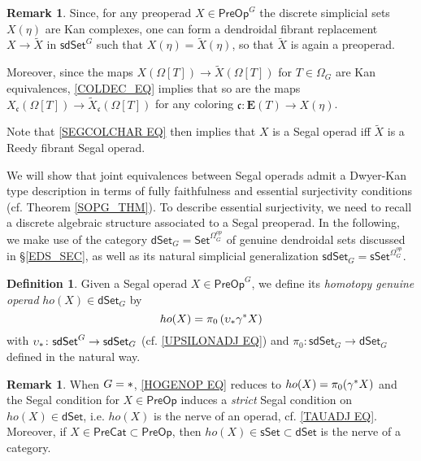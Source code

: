 \documentclass[a4paper,10pt
,draft
]{article}%
\numberwithin{equation}{section}
\numberwithin{figure}{section}
\theoremstyle{definition} %
\newtheorem{definition}[equation]{Definition}%
\newtheorem{remark}[equation]{Remark}%
\newcommand{\dSet}{\mathsf{dSet}}
\newcommand{\1}{\ensuremath{\mathbbm 1}}%
\begin{document}
\begin{remark}\label{REPSEGOPS REM}
Since,
for any preoperad 
$X \in \mathsf{PreOp}^G$
the discrete simplicial sets 
$X(\eta)$ are Kan complexes,
one can form a dendroidal 
fibrant replacement 
$X \to \widetilde{X}$ in 
$\mathsf{sdSet}^G$
such that 
$X(\eta) = \widetilde{X}(\eta)$,
so that $\widetilde{X}$
is again a preoperad.

Moreover, since the maps
$X(\Omega[T]) \to \widetilde{X}(\Omega[T])$ for $T \in \Omega_G$
are Kan equivalences,
\eqref{COLDEC_EQ} %
implies that so are the maps
$X_{\mathfrak{c}}(\Omega[T]) \to \widetilde{X}_{\mathfrak{c}}(\Omega[T])$
for any coloring
$\mathfrak{c} \colon \boldsymbol{E}(T) \to X(\eta)$.

Note that \eqref{SEGCOLCHAR EQ} 
then implies that $X$ is a Segal operad iff 
$\widetilde{X}$ is a Reedy fibrant Segal operad.
\end{remark}



We will show that joint equivalences 
between Segal operads
admit a Dwyer-Kan type description 
in terms of fully faithfulness and essential surjectivity 
conditions (cf. Theorem \ref{SOPG_THM}).
To describe essential surjectivity,
we need to recall a discrete 
algebraic structure associated to a Segal preoperad.
In the following, we make use of the category
$\mathsf{dSet}_G= \mathsf{Set}^{\Omega_G^{op}}$
of genuine dendroidal sets discussed in \S \ref{EDS_SEC},
as well as its natural simplicial generalization
$\mathsf{sdSet}_G= \mathsf{sSet}^{\Omega_G^{op}}$.



\begin{definition}\label{HOMGENOP DEF}
	Given a Segal operad $X \in \mathsf{PreOp}^G$,
	we define its \emph{homotopy genuine operad} $ho(X) \in \dSet_G$ by
\begin{equation}\label{HOGENOP EQ}
	ho(X) = \pi_0\left(\upsilon_{\**}\gamma^{\**}X\right)
\end{equation}
	with 
	$\upsilon_{\**} \colon \mathsf{sdSet}^G \to \mathsf{sdSet}_G$
	(cf. \eqref{UPSILONADJ EQ})
	and 
	$\pi_0 \colon \mathsf{sdSet}_G \to \mathsf{dSet}_G$
	defined in the natural way. 
\end{definition}


\begin{remark}\label{HOISNERVENON REM}
	When $G=\**$, \eqref{HOGENOP EQ}
	reduces to $ho(X) = \pi_0(\gamma^{\**}X)$
	and the Segal condition for 
	$X \in \mathsf{PreOp}$
	induces a \emph{strict} Segal condition
	on $ho(X) \in \mathsf{dSet}$,
	i.e. $ho(X)$ is the nerve of an operad,
	cf. \eqref{TAUADJ EQ}.
	Moreover, if
	$X \in \mathsf{PreCat} \subset \mathsf{PreOp}$,
	then $ho(X) \in \mathsf{sSet} \subset \mathsf{dSet}$
	is the nerve of a category.
\end{remark}
\end{document}
